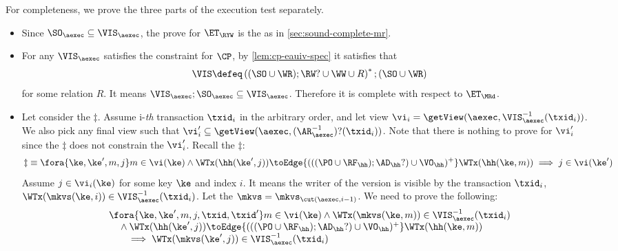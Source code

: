     
For completeness, we prove the three parts of the execution test separately.
\begin{itemize}
\item Since \( \SO_\aexec \subseteq \VIS_\aexec  \), the prove for \( \ET_\RYW \) is the as in \cref{sec:sound-complete-mr}.
\item For any \( \VIS_\aexec \)  satisfies the constraint for \( \CP \), by \cref{lem:cp-eauiv-spec} it satisfies that 
\[
    \VIS \defeq \left( (\SO \cup \WR ) ; \RW? \cup \WW \cup R \right)^* ; (\SO \cup \WR )
\]
for some relation \( R \).
It means \( \VIS_\aexec ; \SO_\aexec \subseteq \VIS_\aexec \).
Therefore it is complete with respect to \( \ET_\MRd \).

\item Let consider the \( \ddagger \).
Assume i-\emph{th} transaction \( \txid_i \) in the arbitrary order,
and let view \( \vi_{i} = \getView(\aexec, \VIS^{-1}_{\aexec}(\txid_{i}) ) \).
We also pick any final view such that \( \vi'_{i} \subseteq \getView(\aexec, (\AR^{-1}_{\aexec})?(\txid_{i}) ) \).
Note that there is nothing to prove for \( \vi'_i \) since the \( \ddagger \) does not constrain the \( \vi'_i \).
Recall the \( \ddagger \):
\[
\ddagger  \equiv 
        \fora{\ke, \ke', m, j}
             m \in \vi(\ke)  \wedge \WTx(\hh(\ke', j)) \toEdge{(((\PO \cup \RF_{\hh}) ; \AD_{\hh}?) \cup \VO_{\hh})^{+}} \WTx(\hh(\ke, m))
         \implies j \in \vi(\ke')  
\]
Assume \( j \in \vi_i(\ke) \) for some key \(\ke \) and index \( i \).
It means the writer of the version is visible by the transaction \( \txid_i\),
\ie \( \WTx(\mkvs(\ke,i)) \in \VIS^{-1}_{\aexec}(\txid_{i}) \).
Let the \( \mkvs = \mkvs_{\cut(\aexec, i-1)} \).
We need to prove the following:
\begin{gather}
    \label{equ:cp-complete-arvis}
    \begin{array}{@{}l@{}}
        \fora{\ke, \ke', m, j, \txid, \txid'} 
        m \in \vi(\ke) 
        \land \WTx(\mkvs(\ke,m)) \in \VIS_\aexec^{-1}(\txid_i) \\
        \quad {} \land \WTx(\hh(\ke', j)) \toEdge{(((\PO \cup \RF_{\hh}) ; \AD_{\hh}?) \cup \VO_{\hh})^{+}} \WTx(\hh(\ke, m)) \\
            \qquad \implies \WTx(\mkvs(\ke',j)) \in \VIS_\aexec^{-1}(\txid_i)
    \end{array}
\end{gather}

\end{itemize}
